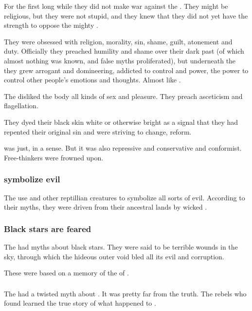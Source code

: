 For the first long while they did not make war against the \dragons. They might be religious, but they were not stupid, and they knew that they did not yet have the strength to oppose the mighty \dragons. 

They were obsessed with religion, morality, sin, shame, guilt, atonement and duty. Officially they preached humility and shame over their dark past (of which almost nothing was known, and false myths proliferated), but underneath the \facade{} they grew arrogant and domineering, addicted to control and power, the power to control other people's emotions and thoughts. Almost like . 

The \Merkyrans{} disliked the body all kinds of sex and pleasure. They preach asceticism and flagellation.

They dyed their black skin white or otherwise bright as a signal that they had repented their original sin and were striving to change, reform.

\Merkyrah{} was just, in a sense. 
But it was also repressive and conservative and conformist. 
Free-thinkers were frowned upon. 





\subsubsection{\Dragons{} symbolize evil}
The \Merkyrans{} use \dragons{} and other reptillian creatures to symbolize all sorts of evil. 
According to their myths, they were driven from their ancestral lands by wicked \dragons. 





\subsubsection{Black stars are feared}
The \Merkyrans{} had myths about black stars. 
They were said to be terrible wounds in the sky, through which the hideous outer void bled all its evil and corruption. 

These were based on a memory of the  of \Erebos. 





\subsubsection{\Thanatzil}
The \Merkyrans{} had a twisted myth about \Thanatzil. 
It was pretty far from the truth. 
The rebels who found \Semiza{} learned the true story of what happened to \Thanatzil. 











